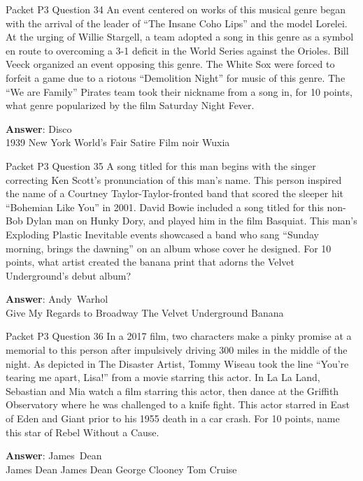 \begin{frame}{Packet P3 Question 34}
An event centered on works   of this musical genre began with the arrival of the leader of “The Insane Coho Lips” and the model Lorelei. At the urging of Willie Stargell, a team adopted a song in this genre as a symbol en route to overcoming a 3-1 deficit in the World Series against the Orioles. Bill Veeck organized an event opposing this genre. The White Sox were forced to forfeit a game due to a riotous “Demolition Night” for music of this genre. The “We are Family” Pirates team took their nickname from a song in, for 10 points, what genre popularized by the film Saturday Night Fever.      

\textbf{Answer}: Disco\\
 1939 New York World's Fair
 Satire
 Film noir
 Wuxia
\end{frame}

\begin{frame}{Packet P3 Question 35}
A song titled for this   man begins with the singer correcting Ken Scott’s pronunciation of this man’s name. This person inspired the name of a Courtney Taylor-Taylor-fronted band that scored the sleeper hit “Bohemian Like You” in 2001. David Bowie included a song titled for this non-Bob Dylan man on Hunky Dory, and played him in the film Basquiat. This man’s Exploding Plastic Inevitable events showcased   a band who sang “Sunday morning, brings the dawning” on an album whose cover   he designed. For 10 points, what artist created the banana print that adorns the Velvet Underground’s debut album?  

\textbf{Answer}: Andy\ Warhol\\
 Give My Regards to Broadway
 The Velvet Underground
 Banana
\end{frame}

\begin{frame}{Packet P3 Question 36}
In a 2017 film, two characters make a pinky promise at a memorial to this person after impulsively driving 300 miles in the middle of the night. As depicted in The Disaster Artist, Tommy Wiseau took the line “You’re tearing me apart, Lisa!” from a movie starring this actor. In La La Land, Sebastian and Mia watch a film starring this actor, then dance at the Griffith Observatory where he was challenged to a knife fight. This actor starred in East of Eden and Giant prior to his 1955 death in a car crash. For 10 points, name this star of Rebel Without a Cause.        

\textbf{Answer}: James\ Dean\\
 James Dean
 James Dean
 George Clooney
 Tom Cruise
\end{frame}

